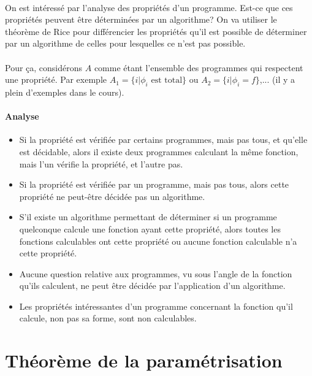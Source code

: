 \paragraph{} On est intéressé par l'analyse des propriétés d'un programme. Est-ce que ces propriétés peuvent être déterminées par un
algorithme? On va utiliser le théorème de Rice pour différencier les propriétés
qu'il est possible de déterminer par un algorithme de celles pour lesquelles ce
n'est pas possible.

\paragraph{}Pour ça, considérons $A$ comme étant l'ensemble des programmes qui
respectent une propriété. Par exemple $A_1 = \{i| \phi_i \text{ est total}\}$ ou
$A_2=\{i|\phi_i = f\}$,... (il y a plein d'exemples dans le cours).

\paragraph{Analyse}
\begin{itemize}
	\item Si la propriété est vérifiée par certains programmes, mais pas tous,
		et qu'elle est décidable, alors il existe deux programmes calculant la
		même fonction, mais l'un vérifie la propriété, et l'autre pas.

	\item Si la propriété est vérifiée par un programme, mais pas tous,
		alors cette propriété ne peut-être décidée pas un algorithme.

	\item S'il existe un algorithme permettant de déterminer si un
		programme quelconque calcule une fonction ayant cette propriété,
		alors toutes les fonctions calculables ont cette propriété ou
		aucune fonction calculable n'a cette propriété.

	\item Aucune question relative aux programmes, vu sous l'angle de la
		fonction qu'ils calculent, ne peut être décidée par
		l'application d'un algorithme.

	\item Les propriétés intéressantes d'un programme concernant la
		fonction qu'il calcule, non pas sa forme,
		sont non calculables.
\end{itemize}



\section{Théorème de la paramétrisation}
\label{sub:th_or_me_de_la_param_trisation}

